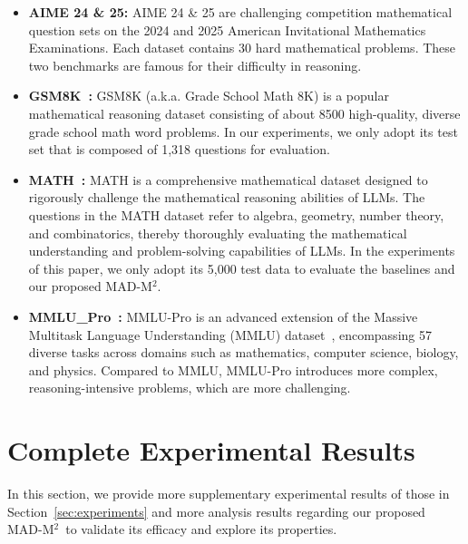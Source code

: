 \documentclass{article} %
\newcommand{\methodname}{MAD-M$^2$}
\theoremstyle{plain}
\begin{document}
\vspace{-5pt}
\begin{itemize}[leftmargin=.1in]
\setlength{\itemsep}{-0.05em}
    \item \textbf{AIME 24 \& 25:} AIME 24 \& 25 are challenging competition mathematical question sets on the 2024 and 2025 American Invitational Mathematics Examinations. Each dataset contains 30 hard mathematical problems. These two benchmarks are famous for their difficulty in reasoning.

    \item \textbf{GSM8K~\citep{gsm8k_dataset}:} GSM8K (a.k.a. Grade School Math 8K) is a popular mathematical reasoning dataset consisting of about 8500 high-quality, diverse grade school math word problems. In our experiments, we only adopt its test set that is composed of 1,318 questions for evaluation.
    
    \item \textbf{MATH~\citep{math_dataset}:} MATH is a comprehensive mathematical dataset designed to rigorously challenge the mathematical reasoning abilities of LLMs. The questions in the MATH dataset refer to algebra, geometry, number theory, and combinatorics, thereby thoroughly evaluating the mathematical understanding and problem-solving capabilities of LLMs. In the experiments of this paper, we only adopt its 5,000 test data to evaluate the baselines and our proposed \methodname. 
    
    \item \textbf{MMLU\_Pro~\citep{wang2024mmlu}:} MMLU-Pro is an advanced extension of the Massive Multitask Language Understanding (MMLU) dataset~\citep{mmlu_dataset}, encompassing 57 diverse tasks across domains such as mathematics, computer science, biology, and physics. Compared to MMLU, MMLU-Pro introduces more complex, reasoning-intensive problems, which are more challenging.
\end{itemize}

\section{Complete Experimental Results}
In this section, we provide more supplementary experimental results of those in Section~\ref{sec:experiments} and more analysis results regarding our proposed \methodname\ to validate its efficacy and explore its properties.
\end{document}
